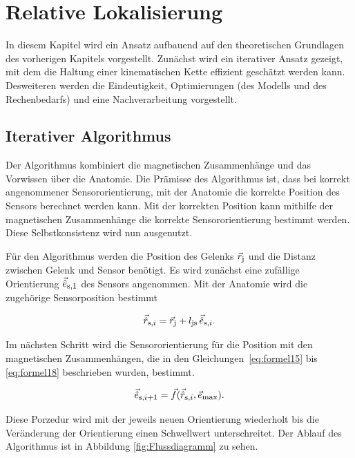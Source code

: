         
        
\section{Relative Lokalisierung}
In diesem Kapitel wird ein Ansatz aufbauend auf den theoretischen Grundlagen des vorherigen Kapitels vorgestellt. Zunächst wird ein iterativer Ansatz gezeigt, mit dem die Haltung einer kinematischen Kette effizient geschätzt werden kann. Desweiteren werden die Eindeutigkeit, Optimierungen (des Modells und des Rechenbedarfs) und eine Nachverarbeitung vorgestellt. 


\subsection{Iterativer Algorithmus}

    Der Algorithmus kombiniert die magnetischen Zusammenhänge und das Vorwissen über die Anatomie. Die Prämisse des Algorithmus ist, dass bei korrekt angenommener Sensororientierung, mit der Anatomie die korrekte Position des Sensors berechnet werden kann. Mit der korrekten Position kann mithilfe der magnetischen Zusammenhänge die korrekte Sensororientierung bestimmt werden. Diese Selbstkonsistenz wird nun ausgenutzt.

    Für den Algorithmus werden die Position des Gelenks $\vec{r}_{\textrm{\footnotesize{j}}}$ und die Distanz zwischen Gelenk und Sensor benötigt. Es wird zunächst eine zufällige Orientierung $\vec{\hat{e}}_{\textrm{\footnotesize{s,1}}}$ des Sensors angenommen. Mit der Anatomie wird die zugehörige Sensorposition bestimmt

    \begin{equation}
        \vec{\hat{r}}_{\textrm{\footnotesize{s,$i$}}} = \vec{r}_{\textrm{\footnotesize{j}}} + l_{\textrm{\footnotesize{js}}} \, \vec{\hat{e}}_{\textrm{\footnotesize{s,$i$}}} .
        \label{eq:formelIter1}
    \end{equation}
    
    Im nächsten Schritt wird die Sensororientierung für die Position mit den magnetischen Zusammenhängen, die in den Gleichungen \,\ref{eq:formel15} bis \ref{eq:formel18} beschrieben wurden, bestimmt.

    \begin{equation}
        	\vec{\hat{e}}_{\textrm{\footnotesize{s,$i+$1}}} = \vec{f}(\vec{\hat{r}}_{\textrm{\footnotesize{s,$i$}}},\vec{e}_{\textrm{\footnotesize{max}}}).
        \label{eq:formelIter2}
    \end{equation} 
    
    Diese Porzedur wird mit der jeweils neuen Orientierung wiederholt bis die Veränderung der Orientierung einen Schwellwert unterschreitet. Der Ablauf des Algorithmus ist in Abbildung \ref{fig:Flussdiagramm} zu sehen.
    

